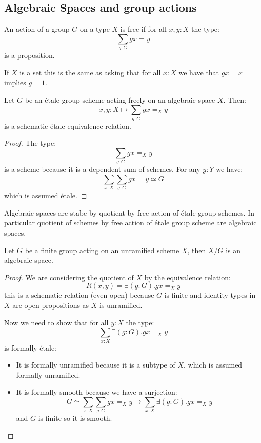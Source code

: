 \subsection{Algebraic Spaces and group actions}

\begin{definition}
An action of a group $G$ on a type $X$ is free if for all $x,y:X$ the type:
\[\sum_{g:G}gx=y\]
 is a proposition.
\end{definition}

If $X$ is a set this is the same as asking that for all $x:X$ we have that $gx=x$ implies $g=1$.

\begin{lemma}
Let $G$ be an étale group scheme acting freely on an algebraic space $X$. Then:
\[x,y:X \mapsto \sum_{g:G}gx=_Xy\]
is a schematic étale equivalence relation.
\end{lemma}

\begin{proof}
The type:
\[\sum_{g:G}gx=_Xy\]
is a scheme because it is a dependent sum of schemes. For any $y:Y$ we have:
\[\sum_{x:X}\sum_{g:G}gx=y \simeq G\]
which is assumed étale.
\end{proof}

\begin{corollary}
Algebraic spaces are stabe by quotient by free action of étale group schemes. In particular quotient of schemes by free action of étale group scheme are algebraic spaces.
\end{corollary}

\begin{lemma}
Let $G$ be a finite group acting on an unramified scheme $X$, then $X/G$ is an algebraic space.
\end{lemma}

\begin{proof}
We are considering the quotient of $X$ by the equivalence relation:
\[R(x,y) = \exists (g:G). gx=_Xy\]
this is a schematic relation (even open) because $G$ is finite and identity types in $X$ are open propositions as $X$ is unramified. 

Now we need to show that for all $y:X$ the type:
\[\sum_{x:X}\exists (g:G). gx=_Xy\]
is formally étale:
\begin{itemize}
\item It is formally unramified because it is a subtype of $X$, which is assumed formally unramified.
\item It is formally smooth because we have a surjection:
\[G \simeq \sum_{x:X}\sum_{g:G} gx=_Xy \to \sum_{x:X}\exists (g:G). gx=_Xy\]
and $G$ is finite so it is smooth.
\end{itemize}
\end{proof}
